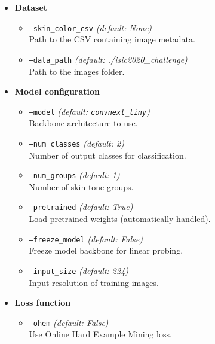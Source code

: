 \begin{itemize}

    \item \textbf{Dataset}
    \begin{itemize}
        \item \texttt{---skin\_color\_csv} \hfill \textit{(default: None)} \\
        Path to the CSV containing image metadata.

        \item \texttt{---data\_path} \hfill \textit{(default: ./isic2020\_challenge)} \\
        Path to the images folder.
    \end{itemize}

    \item \textbf{Model configuration}
    \begin{itemize}
        \item \texttt{---model} \hfill \textit{(default: \texttt{convnext\_tiny})} \\
        Backbone architecture to use.

        \item \texttt{---num\_classes} \hfill \textit{(default: 2)} \\
        Number of output classes for classification.

        \item \texttt{---num\_groups} \hfill \textit{(default: 1)} \\
        Number of skin tone groups.

        \item \texttt{---pretrained} \hfill \textit{(default: True)} \\
        Load pretrained weights (automatically handled).

        \item \texttt{---freeze\_model} \hfill \textit{(default: False)} \\
        Freeze model backbone for linear probing.

        \item \texttt{---input\_size} \hfill \textit{(default: 224)} \\
        Input resolution of training images.
    \end{itemize}

    \item \textbf{Loss function}
    \begin{itemize}
        \item \texttt{---ohem} \hfill \textit{(default: False)} \\
        Use Online Hard Example Mining loss.


\end{itemize}
\end{itemize}
